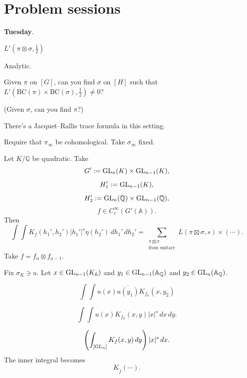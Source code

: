 \documentclass[reqno]{amsart} 
\begin{document}
\section{Problem sessions}
\textbf{Tuesday}.

$L'(\pi \otimes \sigma, \tfrac{1}{2} )$

Analytic.

Given $\pi$ on $[G]$, can you find $\sigma$ on $[H]$ such that $L '(\mathrm{BC}(\pi)\times \mathrm{BC}(\sigma), \tfrac{1}{2} ) \neq 0$?

(Given $\sigma$, can you find $\pi$?)

There's a Jacquet--Rallis trace formula in this setting.

Require that $\pi _\infty$ be cohomological.  Take $\sigma _\infty$ fixed.

Let $K/\mathbb{Q}$ be quadratic.  Take
\begin{equation*}
G' := \operatorname{GL}_n(K) \times \operatorname{GL}_{n - 1}(K),
\end{equation*}
\begin{equation*}
H_1 ' := \operatorname{GL}_{n - 1}(K),
\end{equation*}
\begin{equation*}
H_2 ' := \operatorname{GL}_n(\mathbb{Q}) \times \operatorname{GL}_{n - 1}(\mathbb{Q}),
\end{equation*}
\begin{equation*}
f \in C_c^\infty(G'(\mathbb{A})).
\end{equation*}
Then
\begin{equation*}
  \int \int K_f(h_1', h_2')
  \lvert h_1' \rvert^s
  \eta(h_2')
  \, d h_1' \, d h_2'
  =
  \sum_{
    \substack{
      \pi \boxtimes \sigma  \\
       \text{from unitary}
    }
  }
  L(\pi \boxtimes \sigma, s)
  \times (\dotsb).
\end{equation*}
Take $f = f_n \otimes f_{n - 1}$.

Fix $\sigma_K \ni u$.  Let $x \in \operatorname{GL}_{n - 1}(K_{\mathbb{A}})$ and $y_1 \in \operatorname{GL}_{n - 1}(\mathbb{A}_{\mathbb{Q}})$ and $y_2 \in \operatorname{GL}_n(\mathbb{A}_{\mathbb{Q}})$.

\begin{equation*}
  \int
  \int u(x) \overline{u(y_1)}
  K_{f_n}(x, y_2)
\end{equation*}


\begin{equation*}
\int \int u(x) K_{f_n}(x, y) \lvert x \rvert^s \, d x \, d y.
\end{equation*}

\begin{equation*}
\left( \int_{[\operatorname{GL}_n]} K_f(x, y) \, d y \right) \lvert x \rvert^s \, d x.
\end{equation*}
The inner integral becomes
\begin{equation*}
K_{\tilde{f}}(\dotsb).
\end{equation*}
\end{document}
